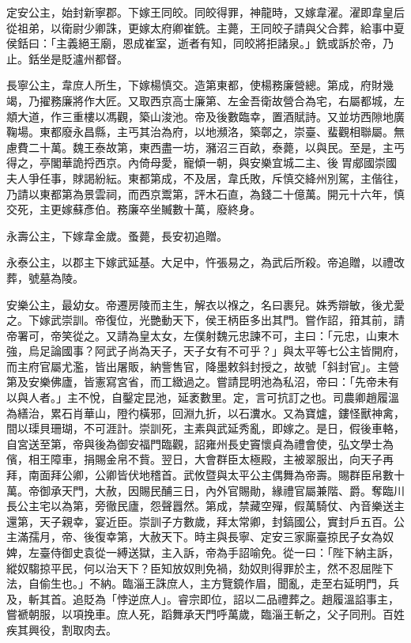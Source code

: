 \begin{pinyinscope}
 定安公主，始封新寧郡。下嫁王同皎。同皎得罪，神龍時，又嫁韋濯。濯即韋皇后從祖弟，以衛尉少卿誅，更嫁太府卿崔銑。主薨，王同皎子請與父合葬，給事中夏侯銛曰：「主義絕王廟，恩成崔室，逝者有知，同皎將拒諸泉。」銑或訴於帝，乃止。銛坐是貶瀘州都督。



 長寧公主，韋庶人所生，下嫁楊慎交。造第東都，使楊務廉營總。第成，府財幾竭，乃擢務廉將作大匠。又取西京高士廉第、左金吾衛故營合為宅，右屬都城，左頫大道，作三重樓以馮觀，築山浚池。帝及後數臨幸，置酒賦詩。又並坊西隙地廣鞠場。東都廢永昌縣，主丐其治為府，以地瀕洛，築鄣之，崇臺、蜚觀相聯屬。無慮費二十萬。魏王泰故第，東西盡一坊，瀦沼三百畝，泰薨，以與民。至是，主丐得之，亭閣華詭捋西京。內倚母愛，寵傾一朝，與安樂宜城二主、後胃郕國崇國夫人爭任事，賕謁紛紜。東都第成，不及居，韋氏敗，斥慎交絳州別駕，主偕往，乃請以東都第為景雲祠，而西京鬻第，評木石直，為錢二十億萬。開元十六年，慎交死，主更嫁蘇彥伯。務廉卒坐贓數十萬，廢終身。



 永壽公主，下嫁韋金歲。蚤薨，長安初追贈。



 永泰公主，以郡主下嫁武延基。大足中，忤張易之，為武后所殺。帝追贈，以禮改葬，號墓為陵。



 安樂公主，最幼女。帝遷房陵而主生，解衣以褓之，名曰裹兒。姝秀辯敏，後尤愛之。下嫁武崇訓。帝復位，光艷動天下，侯王柄臣多出其門。嘗作詔，箝其前，請帝署可，帝笑從之。又請為皇太女，左僕射魏元忠諫不可，主曰：「元忠，山東木強，烏足論國事？阿武子尚為天子，天子女有不可乎？」與太平等七公主皆開府，而主府官屬尤濫，皆出屠販，納訾售官，降墨敕斜封授之，故號「斜封官」。主營第及安樂佛廬，皆憲寫宮省，而工緻過之。嘗請昆明池為私沼，帝曰：「先帝未有以與人者。」主不悅，自鑿定昆池，延袤數里。定，言可抗訂之也。司農卿趙履溫為繕治，累石肖華山，隥彴橫邪，回淵九折，以石瀵水。又為寶爐，鏤怪獸神禽，間以璖貝珊瑚，不可涯計。崇訓死，主素與武延秀亂，即嫁之。是日，假後車輅，自宮送至第，帝與後為御安福門臨觀，詔雍州長史竇懷貞為禮會使，弘文學士為儐，相王障車，捐賜金帛不貲。翌日，大會群臣太極殿，主被翠服出，向天子再拜，南面拜公卿，公卿皆伏地稽首。武攸暨與太平公主偶舞為帝壽。賜群臣帛數十萬。帝御承天門，大赦，因賜民酺三日，內外官賜勛，緣禮官屬兼階、爵。奪臨川長公主宅以為第，旁徹民廬，怨聲囂然。第成，禁藏空殫，假萬騎仗、內音樂送主還第，天子親幸，宴近臣。崇訓子方數歲，拜太常卿，封鎬國公，實封戶五百。公主滿孺月，帝、後復幸第，大赦天下。時主與長寧、定安三家廝臺掠民子女為奴婢，左臺侍御史袁從一縛送獄，主入訴，帝為手詔喻免。從一曰：「陛下納主訴，縱奴騶掠平民，何以治天下？臣知放奴則免禍，劾奴則得罪於主，然不忍屈陛下法，自偷生也。」不納。臨淄王誅庶人，主方覽鏡作眉，聞亂，走至右延明門，兵及，斬其首。追貶為「悖逆庶人」。睿宗即位，詔以二品禮葬之。趙履溫諂事主，嘗褫朝服，以項挽車。庶人死，蹈舞承天門呼萬歲，臨淄王斬之，父子同刑。百姓疾其興役，割取肉去。




\end{pinyinscope}
